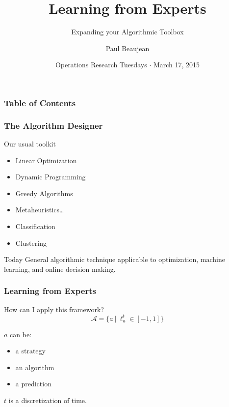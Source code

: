 \documentclass{beamer}
\title{Learning from Experts}
\subtitle{Expanding your Algorithmic Toolbox}
\date{Operations Research Tuesdays $\cdot$ March 17, 2015}
\author{Paul Beaujean\inst{\dag}}
\institute{\inst{\dag}IMT/OLN/NMP/TRM}
\begin{document}
\frame{\titlepage}

\begin{frame}
    \frametitle{Table of Contents}
    \tableofcontents{}
\end{frame}

\begin{frame}
    \frametitle{The Algorithm Designer}

    \begin{block}{Our usual toolkit}
        \begin{itemize}
            \item Linear Optimization
            \item Dynamic Programming
            \item Greedy Algorithms
            \item Metaheuristics\ldots
            \item Classification
            \item Clustering
        \end{itemize}
    \end{block}

    \begin{block}{Today}
        General algorithmic technique applicable to optimization, machine
        learning, and online decision making.
    \end{block}

\end{frame}

\begin{frame}
    \frametitle{Learning from Experts}

    \begin{block}{How can I apply this framework?}
        \begin{equation*}
            \mathcal{A} = \{ a~|~\ell_a^t \in [-1, 1]  \}
        \end{equation*}
        
        $a$ can be:
        \begin{itemize}
            \item a strategy
            \item an algorithm
            \item a prediction
        \end{itemize}
        
        $t$ is a discretization of time.
    \end{block}

\end{frame}
\end{document}
